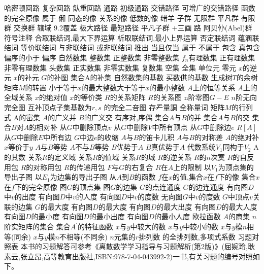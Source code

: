 哈密顿回路
复杂回路
飤重回路
通路
初级通路
交错路径
可增广的交错路径
函数的完全原像
属于
俰
同态的像
关系的像
低数的像
绪羊
子群
无限群
平凡群
有限群
交换群
辖域
9.2覆盖
极大路径
最短路径
平凡子群
$+$三画
路
阿贝仦(Abel)群
{符号注释}
合取联结词,最大下界运算
析取联结词,最小上界运算
否定联结词
蕴涵联结词
等价联结词
与非联结词
或非联结词
推出
当且仅当
属于
不属于
包含
真包含
偏序的小于
偏序
自然数集
整数集
正整数集
非零整数集
$f_{n}$有理数集
正有理数集
非零有理数集
头数集
正实数集
非零实数集
复数集
空集
全集
单位元
零元
$x$的逆元
$x$的补元
$G$的补图
集合A的补集
自然数集的基数
买数倛的基数
生成树$T$的余树矩阵$M$的转置
小于等于$x$的最大整数大于等于$x$的最小整数
$A$上的恒等关系
$A$上的全域关系
$x$的绝对值
$x$的等价类
$R$的关系矩阵
$R$的关系图
n阶零图$G-E$
$n$阶无向完全图
互补顶点子集基数为$r,s$
的完全二咅图
存龵量詷
全称量词
矩阵$M$的行列式
A的崈集
$A$的广义并
$B$的广义交
有序对,序偶
集合$A$与$B$的并
集合$A$与$B$的交
集合$B$对$A$的相对补
从$G$中删除顶点$v$
从$G$中删除$V$中所有顶点
从$G$中删除边$e$
$R[A]$从$G$中删除$E$中所有边
$G$中边$e$的收缩
$A$与$B$的笛卡儿积
$A$与$B$的对称差
$A$的绝对补
$x$等价于$y$
$A$与$B$等势
$A$不与$B$等势
$B$优势于$A$
$B$真优势于$A$
代数系统$V_{1}$同构于$V_{2}$
A的其数
关系$R$的定义域
关系$R$的值域
关系$R$的域
$R$的逆关系
$R$的$n$次寞
$R$的自反用包
$R$的对称用包
$R$的传递用包
$F$与$G$的右复合
$R$在$A$上的限制
以$V_{1}$为顶点集的导出子图
以$E_{1}$为边集的导出子图
从$A$到$B$的函数
$f$在$x$的值,集合$x$在$f$下的像
集合$x$在$f$下的完全原像
图$G$的顶点集
图$G$的边集
$G$的点连通度
$G$的边连通度
有向图$D$中$v$的出度
有向图$D$中$v$的人度
有向图$D$中$v$的度数
无向图$G$中$v$的度数
$G$中顶点$v$关联的边集
$G$的最大度
有向图$D$的最大度
有向图$D$的最大出度
有向图$D$的最大人度
有向图$D$的最小度
有向图$D$的最小出度
有向图$D$的最小人度
欧拉函数
$A$的商集
$n$阶实矩阵的集合
集合$A^{\prime}$的特征函数
$x$与$y$中较大的数
$x$与$y$中较小的数
$x$与$y$模$n$相等(同余)
$x$与$y$模$n$不相等(不同余)
$n$元集的$r$排列数
的全排列数,多项式系数
{习题对照表}
本书的习题解答可参考《离散数学学习指导与习题解析(第2版)》(屈婉玲,耿素云,张立昂,高等教育出版社,ISBN:978-7-04-043992-2)一书,有关习题的编号对照如下。
